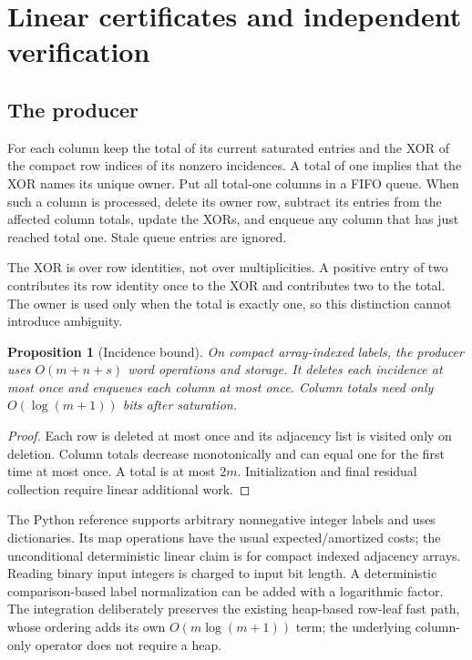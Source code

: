 \documentclass[11pt]{article}
\newtheorem{proposition}[theorem]{Proposition}
\theoremstyle{definition}\newtheorem{definition}[theorem]{Definition}
\theoremstyle{remark}\newtheorem{remark}[theorem]{Remark}
\begin{document}
\section{Linear certificates and independent verification}
\label{sec:certificates}

\subsection{The producer}
For each column keep the total of its current saturated entries and the XOR of the compact row indices of its nonzero incidences. A total of one implies that the XOR names its unique owner. Put all total-one columns in a FIFO queue. When such a column is processed, delete its owner row, subtract its entries from the affected column totals, update the XORs, and enqueue any column that has just reached total one. Stale queue entries are ignored.

The XOR is over row identities, not over multiplicities. A positive entry of two contributes its row identity once to the XOR and contributes two to the total. The owner is used only when the total is exactly one, so this distinction cannot introduce ambiguity.

\begin{proposition}[Incidence bound]
\label{prop:linear}
On compact array-indexed labels, the producer uses $O(m+n+s)$ word operations and storage. It deletes each incidence at most once and enqueues each column at most once. Column totals need only $O(\log(m+1))$ bits after saturation.
\end{proposition}
\begin{proof}
Each row is deleted at most once and its adjacency list is visited only on deletion. Column totals decrease monotonically and can equal one for the first time at most once. A total is at most $2m$. Initialization and final residual collection require linear additional work.
\end{proof}

The Python reference supports arbitrary nonnegative integer labels and uses dictionaries. Its map operations have the usual expected/amortized costs; the unconditional deterministic linear claim is for compact indexed adjacency arrays. Reading binary input integers is charged to input bit length. A deterministic comparison-based label normalization can be added with a logarithmic factor. The integration deliberately preserves the existing heap-based row-leaf fast path, whose ordering adds its own $O(m\log(m+1))$ term; the underlying column-only operator does not require a heap.
\end{document}
